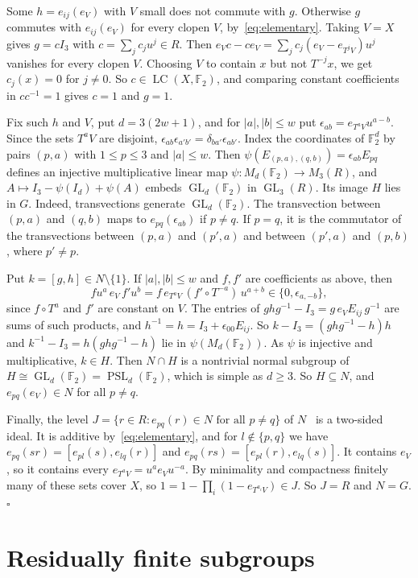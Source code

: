 \documentclass[11pt]{amsart}
\newcommand{\F}{\mathbb F}
\newcommand{\LC}{\operatorname{LC}}
\newcommand{\GL}{\operatorname{GL}}
\newcommand{\PSL}{\operatorname{PSL}}
\begin{document}
Some $h=e_{ij}(e_V)$ with $V$ small does not commute with $g$.
Otherwise $g$ commutes with $e_{ij}(e_V)$ for every clopen $V$,
by~\eqref{eq:elementary}. Taking $V=X$ gives $g=cI_3$ with
$c=\sum_jc_ju^j\in R$. Then $e_Vc-ce_V=\sum_jc_j(e_V-e_{T^jV})u^j$
vanishes for every clopen $V$. Choosing $V$ to contain $x$ but not
$T^{-j}x$, we get $c_j(x)=0$ for $j\ne0$. So $c\in\LC(X,\F_2)$, and
comparing constant coefficients in $cc^{-1}=1$ gives $c=1$ and $g=1$.

Fix such $h$ and $V$, put $d=3(2w+1)$, and for $|a|,|b|\le w$ put
$\epsilon_{ab}=e_{T^aV}u^{a-b}$. Since the sets $T^aV$ are disjoint,
$\epsilon_{ab}\epsilon_{a'b'}=\delta_{ba'}\epsilon_{ab'}$. Index the
coordinates of $\F_2^d$ by pairs $(p,a)$ with $1\le p\le3$ and
$|a|\le w$. Then $\psi(E_{(p,a),(q,b)})=\epsilon_{ab}E_{pq}$ defines an
injective multiplicative linear map $\psi:M_d(\F_2)\to M_3(R)$, and
$A\mapsto I_3-\psi(I_d)+\psi(A)$ embeds $\GL_d(\F_2)$ in $\GL_3(R)$. Its
image $H$ lies in $G$. Indeed, transvections generate $\GL_d(\F_2)$. The
transvection between $(p,a)$ and $(q,b)$ maps to $e_{pq}(\epsilon_{ab})$
if $p\ne q$. If $p=q$, it is the commutator of the transvections between
$(p,a)$ and $(p',a)$ and between $(p',a)$ and $(p,b)$, where $p'\ne p$.

Put $k=[g,h]\in N\setminus\{1\}$. If $|a|,|b|\le w$ and $f,f'$ are
coefficients as above, then
\[
  fu^a\,e_V\,f'u^b=f\,e_{T^aV}\,(f'\circ T^{-a})\,u^{a+b}
  \in\{0,\epsilon_{a,-b}\},
\]
since $f\circ T^a$ and $f'$ are constant on $V$. The entries of
$ghg^{-1}-I_3=g\,e_VE_{ij}\,g^{-1}$ are sums of such products, and
$h^{-1}=h=I_3+\epsilon_{00}E_{ij}$. So $k-I_3=(ghg^{-1}-h)h$ and
$k^{-1}-I_3=h(ghg^{-1}-h)$ lie in $\psi(M_d(\F_2))$. As $\psi$ is
injective and multiplicative, $k\in H$. Then $N\cap H$ is a nontrivial
normal subgroup of $H\cong\GL_d(\F_2)=\PSL_d(\F_2)$, which is simple as
$d\ge3$. So $H\subseteq N$, and $e_{pq}(e_V)\in N$ for all $p\ne q$.

Finally, the level $J=\{r\in R:e_{pq}(r)\in N\text{ for all }p\ne q\}$
of $N$~\cite{Stepanov} is a two-sided ideal. It is additive
by~\eqref{eq:elementary}, and for $l\notin\{p,q\}$ we have
$e_{pq}(sr)=[e_{pl}(s),e_{lq}(r)]$ and $e_{pq}(rs)=[e_{pl}(r),e_{lq}(s)]$.
It contains $e_V$, so it contains every $e_{T^aV}=u^ae_Vu^{-a}$. By
minimality and compactness finitely many of these sets cover $X$, so
$1=1-\prod_i(1-e_{T^{a_i}V})\in J$. So $J=R$ and $N=G$.\hfill$\square$

\section{Residually finite subgroups}
\end{document}
